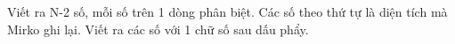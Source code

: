 Viết ra N-2 số, mỗi số trên 1 dòng phân biệt. Các số theo thứ tự là diện tích mà Mirko ghi lại. Viết ra các số với 1 chữ số sau dấu phẩy.  

\